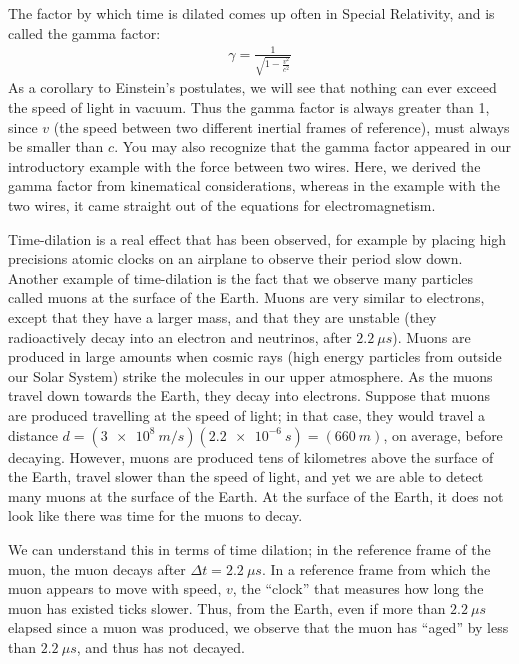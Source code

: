 The factor by which time is dilated comes up often in Special Relativity, and is called the gamma factor:
\begin{align*}
\gamma = \frac{1}{\sqrt{1-\frac{v^2}{c^2}}}
\end{align*}
As a corollary to Einstein's postulates, we will see that nothing can ever exceed the speed of light in vacuum. Thus the gamma factor is always greater than 1, since $v$ (the speed between two different inertial frames of reference), must always be smaller than $c$. You may also recognize that the gamma factor appeared in our introductory example with the force between two wires. Here, we derived the gamma factor from kinematical considerations, whereas in the example with the two wires, it came straight out of the equations for electromagnetism.

Time-dilation is a real effect that has been observed, for example by placing high precisions atomic clocks on an airplane to observe their period slow down. Another example of time-dilation is the fact that we observe many particles called muons at the surface of the Earth. Muons are very similar to electrons, except that they have a larger mass, and that they are unstable (they radioactively decay into an electron and neutrinos, after $\SI{2.2}{\mu s}$). Muons are produced in large amounts when cosmic rays (high energy particles from outside our Solar System) strike the molecules in our upper atmosphere. As the muons travel down towards the Earth, they decay into electrons. Suppose that muons are produced travelling at the speed of light; in that case, they would travel a distance $d=(\SI{3e8}{m/s})(\SI{2.2e-6}{s})=(\SI{660}{m})$, on average, before decaying. However, muons are produced tens of kilometres above the surface of the Earth, travel slower than the speed of light, and yet we are able to detect many muons at the surface of the Earth. At the surface of the Earth, it does not look like there was time for the muons to decay.

We can understand this in terms of time dilation; in the reference frame of the muon, the muon decays after $\Delta t=\SI{2.2}{\mu s}$. In a reference frame from which the muon appears to move with speed, $v$, the ``clock'' that measures how long the muon has existed ticks slower. Thus, from the Earth, even if more than $\SI{2.2}{\mu s}$ elapsed since a muon was produced, we observe that the muon has ``aged'' by less than $\SI{2.2}{\mu s}$, and thus has not decayed.

